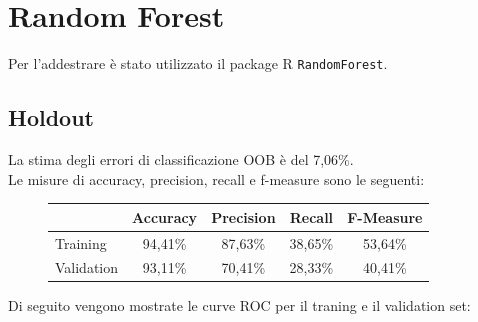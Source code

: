 \section{Random Forest}
Per l'addestrare è stato utilizzato il package R \texttt{RandomForest}.

\subsection{Holdout}
La stima degli errori di classificazione OOB è del 7,06\%.\\

Le misure di accuracy, precision, recall e f-measure sono le seguenti:
\begin{figure}[H]
	\centering
	\begin{tabular}{lcccc}
		\toprule
		& \textbf{Accuracy} & \textbf{Precision} & \textbf{Recall} & 
		\textbf{F-Measure}  \\
		\midrule
		Training	& 94,41\% & 87,63\% & 38,65\% & 53,64\%    	\\ 
		Validation	& 93,11\% & 70,41\% & 28,33\% & 40,41\%   	\\ 
		\bottomrule
	\end{tabular}
	\label{tab:rf_h_performance}
\end{figure}

Di seguito vengono mostrate le curve ROC per il traning e il validation set:

